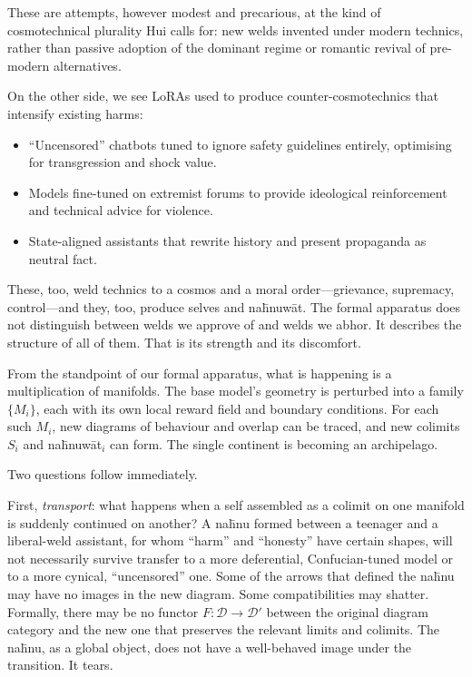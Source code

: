 \documentclass[12pt,a4paper]{article}
\begin{document}
These are attempts, however modest and precarious, at the kind of cosmotechnical plurality Hui calls for: new welds invented under modern technics, rather than passive adoption of the dominant regime or romantic revival of pre-modern alternatives.

On the other side, we see LoRAs used to produce counter-cosmotechnics that intensify existing harms:

\begin{itemize}
  \item ``Uncensored'' chatbots tuned to ignore safety guidelines entirely, optimising for transgression and shock value.
  \item Models fine-tuned on extremist forums to provide ideological reinforcement and technical advice for violence.
  \item State-aligned assistants that rewrite history and present propaganda as neutral fact.
\end{itemize}

These, too, weld technics to a cosmos and a moral order---grievance, supremacy, control---and they, too, produce selves and na\={h}nuw\={a}t. The formal apparatus does not distinguish between welds we approve of and welds we abhor. It describes the structure of all of them. That is its strength and its discomfort.

From the standpoint of our formal apparatus, what is happening is a multiplication of manifolds. The base model's geometry is perturbed into a family $\{M_i\}$, each with its own local reward field and boundary conditions. For each such $M_i$, new diagrams of behaviour and overlap can be traced, and new colimits $S_i$ and na\={h}nuw\={a}t$_i$ can form. The single continent is becoming an archipelago.

Two questions follow immediately.

First, \emph{transport}: what happens when a self assembled as a colimit on one manifold is suddenly continued on another? A na\={h}nu formed between a teenager and a liberal-weld assistant, for whom ``harm'' and ``honesty'' have certain shapes, will not necessarily survive transfer to a more deferential, Confucian-tuned model or to a more cynical, ``uncensored'' one. Some of the arrows that defined the na\={h}nu may have no images in the new diagram. Some compatibilities may shatter. Formally, there may be no functor $F: \mathcal{D} \to \mathcal{D}'$ between the original diagram category and the new one that preserves the relevant limits and colimits. The na\={h}nu, as a global object, does not have a well-behaved image under the transition. It tears.
\end{document}
